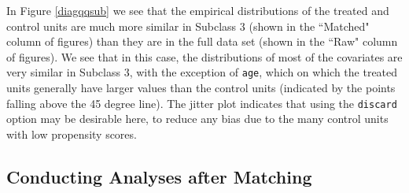 \documentclass[oneside,letterpaper,titlepage]{article}
\begin{document}
\begin{enumerate}
In Figure \ref{diagqqsub} we see that the empirical distributions of the treated and control units are much more similar
in Subclass 3 (shown in the ``Matched" column of figures) than they are in the full data set (shown in the ``Raw" column of 
figures).  
We see that in this case, 
the distributions of most of the covariates are very similar in Subclass 3, with the exception of \texttt{age}, which
on which the treated units generally have larger values than the control units (indicated by the points falling above the 45 
degree line).
The jitter plot indicates that using the \texttt{discard} option may be 
desirable here, to reduce any bias due to the many control units with low propensity scores.  

\end{enumerate}

%
%



\subsection{Conducting Analyses after Matching}
\label{subsec:analysis}
\end{document}
